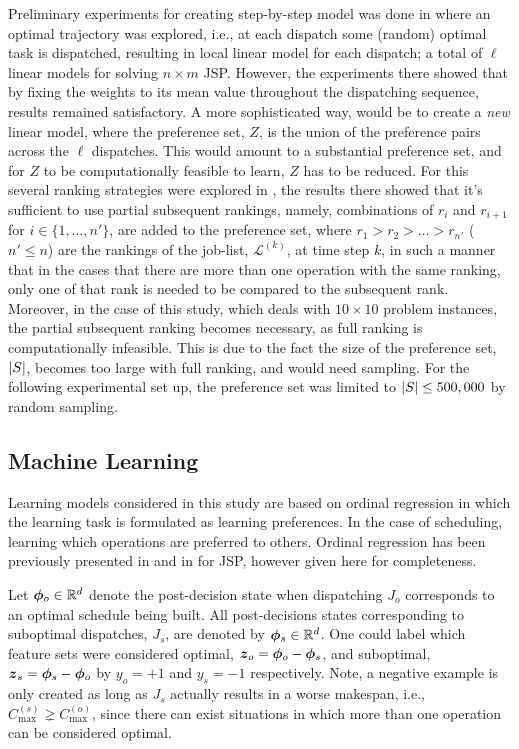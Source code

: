 \documentclass[smallextended]{svjour3}
\begin{document}
Preliminary experiments for creating step-by-step model was done in 
\cite{InRu11a} where an optimal trajectory was explored, i.e., at each dispatch 
some (random) optimal task is dispatched, resulting in local linear model for 
each dispatch; a total of $\ell$ linear models for solving $n\times m$ JSP. 
However, the experiments there showed that by fixing the weights to its mean 
value throughout the dispatching sequence, results remained satisfactory.
A more sophisticated way, would be to create a \emph{new} linear model, where 
the preference set, $Z$, is the union of the preference pairs across the 
$\ell$ 
dispatches. 
This would amount to a substantial preference set, and for $Z$ to be 
computationally feasible to learn, $Z$ has to be reduced. For this several 
ranking strategies were explored in \cite{InRu15a}, the results there showed 
that it's sufficient to use partial subsequent rankings, namely, combinations 
of $r_i$ and $r_{i+1}$ for $i\in\{1,\ldots,n'\}$, are added to the preference 
set, where $r_1>r_2>\ldots>r_{n'}$ ($n'\leq n$) are the rankings of the 
job-list, $\mathcal{L}^{(k)}$, at time step $k$, in such a manner that in the 
cases that there are more than one operation with the same ranking, only one of 
that rank is needed to be compared to the subsequent rank. 
Moreover, in the case of this study, which deals with $10\times 10$ problem 
instances, the partial subsequent ranking becomes necessary, as full ranking is 
computationally infeasible. This is due to the fact the size of the preference 
set, $\lvert S\rvert$, becomes too large with full ranking, and would need sampling.
For the following experimental set up, the preference set was limited to 
$\lvert S\rvert\leq 500,000$ by random sampling.

\subsection{Machine Learning}\label{sec:liblinear}

Learning models considered in this study are based on ordinal regression in 
which the learning task is formulated as learning preferences. In the case of 
scheduling, learning which operations are preferred to others. Ordinal 
regression has been previously presented in \cite{Ru06:PPSN} and in 
\cite{InRu11a} for JSP, however given here for completeness. 

Let $\bm{\phi}_{o}\in{\mathbb R}^d$ denote the post-decision state when dispatching $J_o$ 
corresponds to an optimal schedule being built. All post-decisions states 
corresponding to suboptimal dispatches, $J_s$, are denoted by 
$\bm{\phi}_{s}\in{\mathbb R}^d$. One could label which feature sets were considered optimal, 
$\vec{z}_{o}=\vphi_{o}-\vphi_{s}$, and suboptimal, 
$\vec{z}_{s}=\vphi_{s}-\vphi_{o}$ by $y_o=+1$ and $y_s=-1$ respectively. 
Note, a negative example is only created as long as $J_s$ actually results in a 
worse makespan, i.e., $C_{\max}^{(s)}\gneq C_{\max}^{(o)}$, since there can 
exist situations in which more than one operation can be considered optimal.
\end{document}
